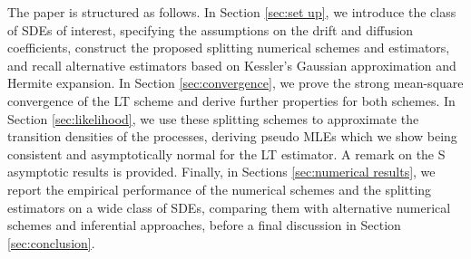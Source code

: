 \documentclass[a4paper,12pt]{article}
\numberwithin{equation}{section}
\theoremstyle{plain}
\theoremstyle{definition}
\begin{document}
The paper is structured as follows. In Section \ref{sec:set up}, we introduce the class of SDEs of interest, specifying the assumptions on the drift and diffusion coefficients, construct the proposed splitting numerical schemes and estimators, and recall alternative estimators based on Kessler's Gaussian approximation and Hermite expansion. 
In Section \ref{sec:convergence}, we prove the strong mean-square convergence of the LT scheme and derive further properties for both schemes. In Section \ref{sec:likelihood}, we use these splitting schemes to approximate the transition densities of the processes, deriving pseudo MLEs which we show being consistent and asymptotically normal for the LT estimator. A remark on the S asymptotic results is provided. Finally, in Sections \ref{sec:numerical results},  we report the empirical performance of the numerical schemes and the splitting estimators on a wide class of SDEs, comparing them with alternative numerical schemes and inferential approaches, before a final discussion in Section \ref{sec:conclusion}.
\end{document}
